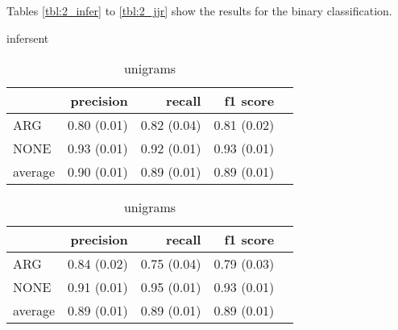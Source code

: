 Tables \ref{tbl:2_infer} to \ref{tbl:2_jjr} show the results for the binary classification.
\begin{table}[!htb]
    \begin{minipage}{.5\linewidth}
      \caption{infersent}
      \label{tbl:2_infer}
      \centering
      
\begin{tabular}{@{}lrrrr@{}}
\toprule
 	&	 precision &	 recall &	 f1 score  \\ \midrule
ARG	&	 0.80 \scriptsize{(0.01)} &	 0.82 \scriptsize{(0.04)} &	 0.81 \scriptsize{(0.02)}  \\
NONE	&	 0.93 \scriptsize{(0.01)} &	 0.92 \scriptsize{(0.01)} &	 0.93 \scriptsize{(0.01)}  \\
average	&	 0.90 \scriptsize{(0.01)} &	 0.89 \scriptsize{(0.01)} &	 0.89 \scriptsize{(0.01)}  \\
\bottomrule
\end{tabular}

  \end{minipage}%
    \begin{minipage}{.5\linewidth}
      \centering
        \caption{unigrams}
        \label{tbl:2_uni}
\begin{tabular}{@{}lrrrr@{}}
\toprule
 	&	 precision &	 recall &	 f1 score  \\ \midrule 
ARG	&	 0.84 \scriptsize{(0.02)} &	 0.75 \scriptsize{(0.04)} &	 0.79 \scriptsize{(0.03)}  \\ 
NONE	&	 0.91 \scriptsize{(0.01)} &	 0.95 \scriptsize{(0.01)} &	 0.93 \scriptsize{(0.01)}  \\ 
average	&	 0.89 \scriptsize{(0.01)} &	 0.89 \scriptsize{(0.01)} &	 0.89 \scriptsize{(0.01)}  \\ 
\bottomrule
\end{tabular}
    \end{minipage} 
\end{table}



